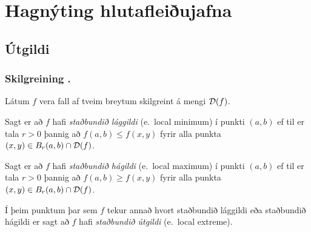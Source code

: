 
\theoremstyle{definition}
\newtheorem{exercise}[theorem]{}





\newbox\mytempbox
\newdimen\mytempdimen

\newcommand\includegraphicscopyright[3][]{%
  \leavevmode\vbox{\vskip3pt\raggedright\setbox\mytempbox=\hbox{\texttt{[image: \#2]}}%
    \mytempdimen=\wd\mytempbox\box\mytempbox\par\vskip1pt%
    \fontsize{3}{3.5}\selectfont{\color{black!25}{\vbox{\hsize=\mytempdimen#3}}}\vskip3pt%
}}

\newenvironment{colortabular}[1]{\medskip\rowcolors[]{1}{blue!20}{blue!10}\tabular{#1}\rowcolor{blue!40}}{\endtabular\medskip}

\def\equad{\leavevmode\hbox{}\quad}

\newenvironment{greencolortabular}[1]
{\medskip\rowcolors[]{1}{green!50!black!20}{green!50!black!10}%
  \tabular{#1}\rowcolor{green!50!black!40}}%
{\endtabular\medskip}




\section{Hagnýting hlutafleiðujafna}

\subsection{Útgildi} 

\subsubsection{Skilgreining \kaflanr.}
 Látum $f$ vera fall af tveim breytum
skilgreint á mengi ${\cal D}(f)$.  

\medskip
Sagt er að $f$ hafi {\em \color{red} staðbundið
  lággildi} (e.~local minimum) í punkti $(a,b)$ ef til er tala $r>0$ þannig að 
$f(a,b)\leq f(x,y)$ fyrir alla punkta $(x,y)\in B_r(a,b)\cap{\cal
  D}(f)$.

\medskip
Sagt er að $f$ hafi {\em \color{red} staðbundið
  hágildi}  (e.~local maximum) í punkti $(a,b)$ ef til er tala $r>0$ þannig að 
$f(a,b)\geq f(x,y)$ fyrir alla punkta $(x,y)\in B_r(a,b)\cap{\cal
  D}(f)$.

\medskip
Í þeim punktum þar sem $f$ tekur annað hvort staðbundið lággildi eða
staðbundið hágildi er sagt að $f$ hafi {\em \color{red} staðbundið útgildi}
(e.~local extreme). 


